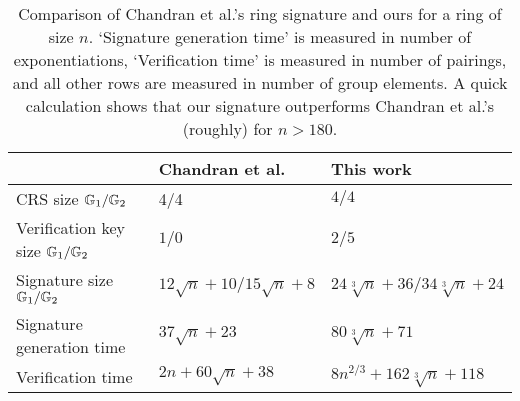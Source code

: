 
\begin{table}[h]
\begin{center}
\begin{minipage}{\textwidth}
\begin{center}
\begin{tabular}{l|l|l}
                                           & Chandran et al.~\cite{ICALP:ChaGroSah07} & This work \\
\hline%
\rule{0pt}{2.5ex}CRS size  $\mathbb{G}_1/\mathbb{G}_2$              & 4/4                                      & $4/4$       \\
\rule{0pt}{2.5ex}Verification key size $\mathbb{G}_1/\mathbb{G}_2$    & $1/0$                                       & $2/5$       \\
\rule{0pt}{2.5ex}Signature size      $\mathbb{G}_1/\mathbb{G}_2$      & $12\sqrt{n}+10/15\sqrt{n}+8$                        & $24\sqrt[3]{n} + 36/34\sqrt[3]{n} + 24$\\
\rule{0pt}{2.5ex}Signature generation time & $37\sqrt{n}+23$                        & $80\sqrt[3]{n}+71$\\
\rule{0pt}{2.5ex}Verification time         & $2n + 60\sqrt{n}+38$                & $8n^{2/3} + 162\sqrt[3]{n} + 118$\\
\end{tabular}
\end{center}
\caption{Comparison of Chandran et al.'s ring signature and ours for a ring of size $n$. `Signature generation time' is measured in number of exponentiations, `Verification time' is measured in number of pairings, and all other rows are measured in number of group elements. A quick calculation shows that our signature outperforms Chandran et al.'s (roughly) for $n>180$.\label{table:eff}}
\end{minipage}
\end{center}
\end{table}
